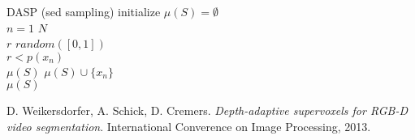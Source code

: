 \documentclass[12pt,a4paper]{article}
\begin{document}
	\begin{algorithm}[t!]
		\begin{algo}{DASP (sed sampling)}{\label{algo:superpixel-segmentation-depth-dasp-random}}
			initialize $\mu(S) = \emptyset$\\
			\qfor $n = 1$ \qto $N$\\
				$r$ \qlet $random([0, 1])$\\
				\qif $r < p(x_n)$\\
					\qthen $\mu(S)$ \qlet  $\mu(S) \cup \{x_n\}$\qfi\qrof\\
			\qreturn $\mu(S)$
		\end{algo}
		\caption[\textbf{DASP} \cite{WeikersdorferGossowBeetz} randomly samples the initial superpixel centers from a custom density based on depth information.]{The easiest way to sample superpixel centers form the superpixel density $p(x_n)$ is given by random sampling. For each pixel, a number in the range $[0,1]$ is randomly chosen and compared to the probability $p(x_n)$ of $x_n$ being an initial superpixel center. For details how the desired number of superpixels is met we refer to the implementation.}
		\label{fig:superpixel-segmentation-depth-dasp-random}
	\end{algorithm}

	\begin{thebibliography}{1}
		D. Weikersdorfer, A. Schick, D. Cremers.
		\emph{Depth-adaptive supervoxels for RGB-D video segmentation}.
		International Converence on Image Processing, 2013.
	\end{thebibliography}
\end{document}
